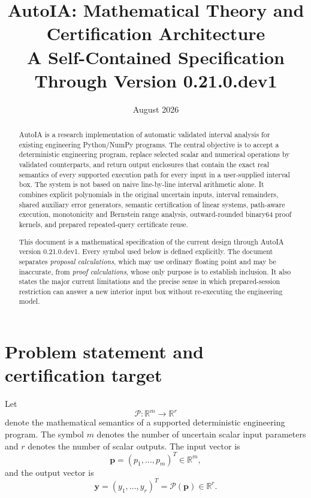 \documentclass[11pt]{article}
\title{\textbf{AutoIA: Mathematical Theory and Certification Architecture}\\
A Self-Contained Specification Through Version 0.21.0.dev1}
\author{}
\date{August 2026}
\newcommand{\R}{\mathbb{R}}
\newcommand{\pv}{\mathbf{p}}
\newcommand{\yv}{\mathbf{y}}
\begin{document}
\maketitle

\begin{abstract}
AutoIA is a research implementation of automatic validated interval analysis for
existing engineering Python/NumPy programs.  The central objective is to accept a
deterministic engineering program, replace selected scalar and numerical operations
by validated counterparts, and return output enclosures that contain the exact real
semantics of every supported execution path for every input in a user-supplied
interval box.  The system is not based on naive line-by-line interval arithmetic
alone.  It combines explicit polynomials in the original uncertain inputs,
interval remainders, shared auxiliary error generators, semantic certification of
linear systems, path-aware execution, monotonicity and Bernstein range analysis,
outward-rounded binary64 proof kernels, and prepared repeated-query certificate
reuse.

This document is a mathematical specification of the current design through
AutoIA version 0.21.0.dev1.  Every symbol used below is defined explicitly.  The
document separates \emph{proposal calculations}, which may use ordinary floating
point and may be inaccurate, from \emph{proof calculations}, whose only purpose is
to establish inclusion.  It also states the major current limitations and the
precise sense in which prepared-session restriction can answer a new interior
input box without re-executing the engineering model.
\end{abstract}

\tableofcontents
\newpage

\section{Problem statement and certification target}

Let
\[
  \mathcal{P}:\R^m\rightarrow\R^r
\]
denote the mathematical semantics of a supported deterministic engineering
program.  The symbol \(m\) denotes the number of uncertain scalar input
parameters and \(r\) denotes the number of scalar outputs.  The input vector is
\[
  \pv=(p_1,\ldots,p_m)^T\in\R^m,
\]
and the output vector is
\[
  \yv=(y_1,\ldots,y_r)^T=\mathcal{P}(\pv)\in\R^r.
\]
\end{document}
